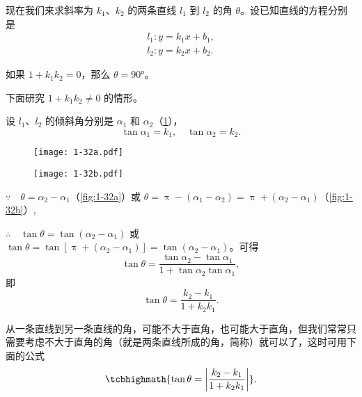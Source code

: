 \medskip
现在我们来求斜率为 $k_1$、$k_2$ 的两条直线 $l_1$ 到 $l_2$ 的角 $\theta$。设已知直线的方程分别是
\begin{gather*}
  l_1: y=k_1x+b_1,\\
  l_2: y=k_2x+b_2.
\end{gather*}

如果 $1+k_1k_2=0$，那么 $\theta = \ang{90}$。

下面研究 $1+k_1k_2\neq0$ 的情形。

设 $l_1$、$l_2$ 的倾斜角分别是 $\alpha_1$ 和 $\alpha_2$（\cref{fig:1-32}），
\[ \tan\alpha_1=k_1,\quad \tan\alpha_2=k_2.\]
\begin{figure}
  \begin{minipage}[b]{0.48\linewidth}\centering
  \texttt{[image: 1-32a.pdf]}
  \subcaption{}\label{fig:1-32a}
  \end{minipage}
  \begin{minipage}[b]{0.48\linewidth}\centering
  \texttt{[image: 1-32b.pdf]}
  \subcaption{}\label{fig:1-32b}
  \end{minipage}
  \caption{}\label{fig:1-32}
\end{figure}

$\because\quad\theta =\alpha_2-\alpha_1$（\cref{fig:1-32a}）或 $\theta = \uppi - (\alpha_1-\alpha_2) = \uppi+(\alpha_2-\alpha_1)$（\cref{fig:1-32b}）,

$\therefore\quad\tan\theta = \tan(\alpha_2-\alpha_1)$ 或 $\tan\theta = \tan[\uppi+(\alpha_2-\alpha_1)]= \tan(\alpha_2-\alpha_1)$。可得
\[ \tan\theta=\frac{\tan\alpha_2-\tan\alpha_1}{1+\tan\alpha_2\tan\alpha_1},\]
即
\[ \tan\theta = \frac{k_2-k_1}{1+k_2k_1}.\]

从一条直线到另一条直线的角，可能不大于直角，也可能大于直角，但我们常常只需要考虑不大于直角的角（就是两条直线所成的角，简称）就可以了，这时可用下面的公式
\[ \tcbhighmath{\tan\theta = \left|\frac{k_2-k_1}{1+k_2k_1}\right|}.\]

